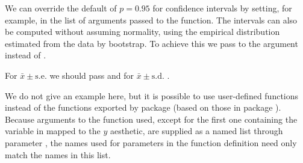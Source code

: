\documentclass[krantz2]{krantz}\usepackage{knitr}
\begin{document}
We can override the default of $p = 0.95$ for confidence intervals by setting, for example,  in the list of arguments passed to the function. The intervals can also be computed without assuming normality, using the empirical distribution estimated from the data by bootstrap. To achieve this we pass to  the argument  instead of .

\begin{knitrout}\footnotesize
{}\color{fgcolor}\begin{kframe}
\begin{alltt}
  \hlstd{(} \hlstd{=} \hlstd{,}
                \hlstd{=} \hlstd{(} \hlstd{=} \hlstd{),}
                \hlstd{=} \hlstd{,}  \hlstd{=} \hlstd{,}  \hlstd{=} \hlstd{)}
\end{alltt}
\end{kframe}
\end{knitrout}

For $\bar{x} \pm \mathrm{s.e.}$ we should pass  and for $\bar{x} \pm \mathrm{s.d.}$ .

\begin{knitrout}\footnotesize
{}\color{fgcolor}\begin{kframe}
\begin{alltt}
  \hlstd{(} \hlstd{=} \hlstd{,}
                \hlstd{=} \hlstd{,}  \hlstd{=} \hlstd{,}  \hlstd{=} \hlstd{)}
\end{alltt}
\end{kframe}
\end{knitrout}

We do not give an example here, but it is possible to use user-defined functions instead of the functions exported by package \ggplot (based on those in package \Hmisc). Because arguments to the function used, except for the first one containing the variable in  mapped to the $y$ aesthetic, are supplied as a named list through parameter , the names used for parameters in the function definition need only match the names in this list.
\end{document}
